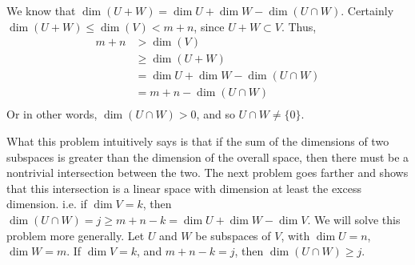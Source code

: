 \documentclass{book}
\begin{document}
\begin{enumerate}[label=\arabic*)]

      We know that $\dim(U + W) = \dim U + \dim W - \dim(U \cap W)$. Certainly $\dim(U + W) \leq \dim (V) < m + n$, since $U + W \subset V$. Thus,
      \begin{align*}
        m + n 
        & > \dim(V) \\
        & \geq \dim(U + W) \\
        & = \dim U + \dim W - \dim(U \cap W) \\
        & = m + n - \dim(U \cap W) \\
      \end{align*}
      Or in other words, $\dim(U \cap W) > 0$, and so $U \cap W \neq \{0\}$.

      What this problem intuitively says is that if the sum of the dimensions of two subspaces is greater than the dimension of the overall space, then there must be a
      nontrivial intersection between the two. The next problem goes farther and shows that this intersection is a linear space with dimension at least the excess dimension.
      i.e. if $\dim V = k$, then $\dim(U \cap W) = j \geq m + n - k = \dim U + \dim W - \dim V$.
    \ii
      We will solve this problem more generally. Let $U$ and $W$ be subspaces of $V$, with $\dim U = n$, $\dim W = m$. If $\dim V = k$, and $m + n - k = j$, then $\dim (U \cap
      W) \geq j$. 
      

\end{enumerate}
\end{document}
